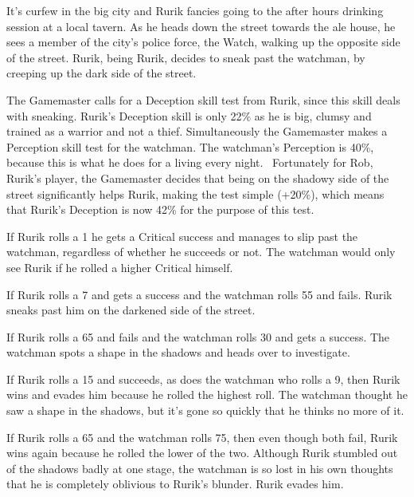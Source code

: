 \begin{rpg-examplebox}
It’s curfew in the big city and Rurik fancies going to the after hours drinking session at a local tavern. As he heads down the street towards the ale house, he sees a member of the city’s police force, the Watch, walking up the opposite side of the street. Rurik, being Rurik, decides to sneak past the watchman, by creeping up the dark side of the street.

The Gamemaster calls for a Deception skill test from Rurik, since this skill deals with sneaking. Rurik’s Deception skill is only 22\% as he is big, clumsy and trained as a warrior and not a thief. Simultaneously the Gamemaster makes a Perception skill test for the watchman. The watchman’s Perception is 40\%, because this is what he does for a living every night.  Fortunately for Rob, Rurik’s player, the Gamemaster decides that being on the shadowy side of the street significantly helps Rurik, making the test simple (+20\%), which means that Rurik’s Deception is now 42\% for the purpose of this test.

If Rurik rolls a 1 he gets a Critical success and manages to slip past the watchman, regardless of whether he succeeds or not. The watchman would only see Rurik if he rolled a higher Critical himself.

If Rurik rolls a 7 and gets a success and the watchman rolls 55 and fails. Rurik sneaks past him on the darkened side of the street.

If Rurik rolls a 65 and fails and the watchman rolls 30 and gets a success. The watchman spots a shape in the shadows and heads over to investigate.

If Rurik rolls a 15 and succeeds, as does the watchman who rolls a 9, then Rurik wins and evades him because he rolled the highest roll. The watchman thought he saw a shape in the shadows, but it’s gone so quickly that he thinks no more of it.

If Rurik rolls a 65 and the watchman rolls 75, then even though both fail, Rurik wins again because he rolled the lower of the two. Although Rurik stumbled out of the shadows badly at one stage, the watchman is so lost in his own thoughts that he is completely oblivious to Rurik’s blunder. Rurik evades him.
\end{rpg-examplebox}


